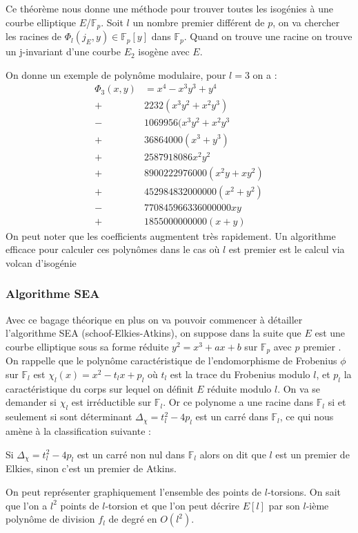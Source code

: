 \documentclass[12pt]{article}
\begin{document}
Ce théorème nous donne une méthode pour trouver toutes les isogénies à une courbe elliptique $E$/$\mathbb{F}_p$. Soit $l$ un nombre premier différent de $p$, on va chercher les racines de $\Phi_l(j_E, y) \in \mathbb{F}_p[y]$ dans $\mathbb{F}_p$. Quand on trouve une racine on trouve un j-invariant d'une courbe $E_2$ isogène avec $E$. 

On donne un exemple de polynôme modulaire, pour $ l =3$ on a :
\begin{align*}
\Phi_3(x,y) &= x^4 -x^3y^3 + y^4 \\
 +& 2232(x^3y^2 + x^2y^3) \\
 -& 1069956(x^3y^2 + x^2y^3 \\
 +& 36864000(x^3 + y^3) \\
 +& 2587918086x^2y^2 \\
 +& 8900222976000(x^2y + xy^2) \\
 +& 452984832000000(x^2 + y^2) \\
 -& 770845966336000000xy \\
 +& 1855000000000(x+y) 
\end{align*}
On peut noter que les coefficients augmentent très rapidement. Un algorithme efficace pour calculer ces polynômes dans le cas où $l$ est premier est le calcul via volcan d'isogénie \cite{volcan}

\subsubsection{Algorithme SEA}
Avec ce bagage théorique en plus on va pouvoir commencer à détailler l'algorithme SEA (schoof-Elkies-Atkins), on suppose dans la suite que $E$ est une courbe elliptique sous sa forme réduite $y^2 = x^3 + ax +b$ sur $\mathbb{F}_p$ avec $p$ premier . On rappelle que le polynôme caractéristique de l’endomorphisme de Frobenius $\phi$ sur $\mathbb{F}_l$ est $\chi_l(x) = x^2 - t_lx +p_l$ où $t_l$ est la trace du Frobenius modulo $l$, et $p_l$ la caractéristique du corps sur lequel on définit $E$ réduite modulo $l$. On va se demander si $\chi_l$ est irréductible sur $\mathbb{F}_l$. Or ce polynome a une racine dans $\mathbb{F}_l$ si et seulement si sont déterminant $\Delta_{\chi} = t_l^2 - 4p_l$ est un carré dans $\mathbb{F}_l$, ce qui nous amène à la classification suivante :

\begin{defi}
\label{Atkins's prime}
Si $\Delta_{\chi} = t_l^2 - 4p_l$ est un carré non nul dans $\mathbb{F}_l$ alors on dit que $l$ est un premier de Elkies, sinon c'est un premier de Atkins.
\end{defi}
\bigskip
On peut représenter graphiquement l'ensemble des points de $l$-torsions. On sait que l'on a $l^2$ points de $l$-torsion et que l'on peut décrire $E[l]$ par son $l$-ième polynôme de division $f_l$ de degré en $O(l^2)$.
\end{document}
